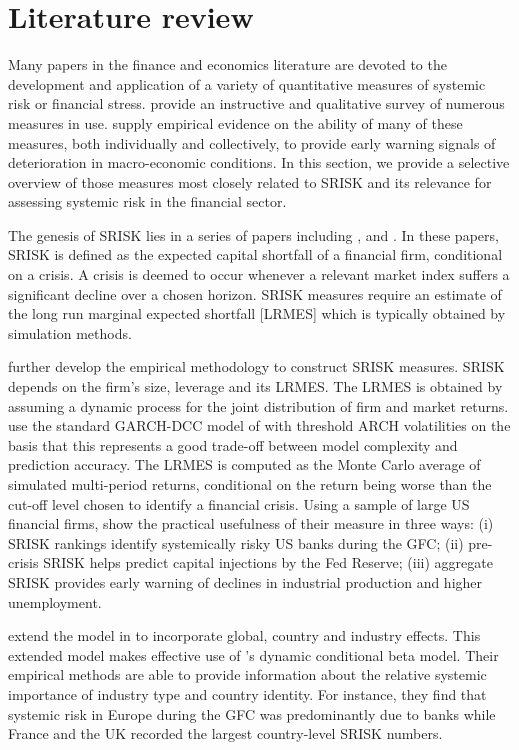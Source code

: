\documentclass[12pt]{article}
\begin{document}
\section{Literature review}\label{litrev}
Many papers in the finance and economics literature are devoted to the development and application of a variety of quantitative measures of systemic risk or financial stress. \cite{Bisias2012} provide an instructive and qualitative survey of numerous measures in use. \cite{Giglio2015} supply empirical evidence on the ability of many of these measures, both individually and collectively, to provide early warning signals of deterioration in macro-economic conditions. In this section, we provide a selective overview of those measures most closely related to SRISK and its relevance for assessing systemic risk in the financial sector. 

The genesis of SRISK lies in a series of papers including \cite{acharya2012aer}, \cite{acharya2012wp} and \cite{brownlees2010volatility}. In these papers, SRISK is defined as the expected capital shortfall of a financial firm, conditional on a crisis. A crisis is deemed to occur whenever a relevant market index suffers a significant decline over a chosen horizon. SRISK measures require an estimate of the long run marginal expected shortfall [LRMES] which is typically obtained by simulation methods.

\cite{brownlees2015} further develop the empirical methodology to construct SRISK measures. SRISK depends on the firm's size, leverage and its LRMES. The LRMES is obtained by assuming a dynamic process for the joint distribution of firm and market returns. \cite{brownlees2015} use  the standard GARCH-DCC model of \cite{engle2002dynamic} with threshold ARCH volatilities on the basis that this represents a good trade-off between model complexity and prediction accuracy. The LRMES is computed as the Monte Carlo average of simulated multi-period returns,  conditional on the return being worse than the cut-off level chosen to identify a financial crisis. Using a sample of large US financial firms,  \cite{brownlees2015} show the practical usefulness of their measure in three ways: (i) SRISK rankings identify systemically risky US banks during the GFC; (ii) pre-crisis SRISK helps predict capital injections by the Fed Reserve; (iii) aggregate SRISK provides early warning of declines in industrial production and higher unemployment.
     
\cite{Engle2015} extend the model in \cite{brownlees2015} to incorporate global, country and industry effects. This extended model makes effective use of \cite{Engle2014dcb}'s dynamic conditional beta model. Their empirical methods are able to provide information about the relative systemic importance of industry type and country identity. For instance, they find  that systemic risk in Europe during the GFC was predominantly due to banks while France and the UK recorded the largest country-level SRISK numbers. 
\end{document}
